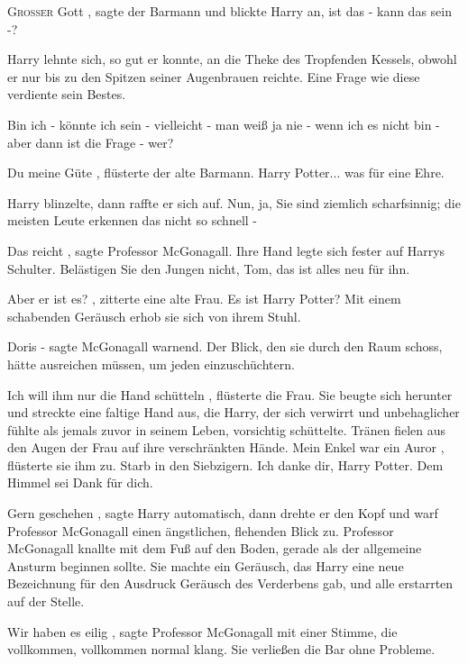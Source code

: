
\lettrine{\glqq G}{roßer} Gott\grqq{} , sagte der Barmann
und blickte Harry an, \glqq ist das - kann das sein -?\grqq{}

Harry lehnte sich, so gut er konnte, an die
Theke des Tropfenden Kessels, obwohl er nur bis zu den Spitzen seiner Augenbrauen reichte. Eine Frage wie diese
verdiente sein Bestes.

\glqq Bin ich - könnte ich sein - vielleicht - man weiß ja nie - wenn ich es nicht
bin - aber dann ist die Frage - wer?\grqq{}

\glqq Du meine Güte\grqq{} , flüsterte der alte Barmann.
\glqq Harry Potter... was für eine Ehre.\grqq{}

 Harry blinzelte, dann raffte er sich auf. \glqq Nun, ja, Sie
sind ziemlich scharfsinnig; die meisten Leute erkennen das nicht so schnell -\grqq{}

\glqq Das reicht\grqq{} ,
sagte Professor McGonagall. Ihre Hand legte sich fester auf Harrys Schulter. \glqq Belästigen Sie den Jungen nicht, Tom,
das ist alles neu für ihn.\grqq{}

\glqq Aber er ist es?\grqq{} , zitterte eine alte Frau. \glqq Es ist Harry
Potter?\grqq{} Mit einem schabenden Geräusch erhob sie sich von ihrem Stuhl.

\glqq Doris -\grqq{} sagte
McGonagall warnend. Der Blick, den sie durch den Raum schoss, hätte ausreichen müssen, um jeden einzuschüchtern.

\glqq Ich will ihm nur die Hand schütteln\grqq{} , flüsterte die Frau. Sie beugte sich herunter und streckte
eine faltige Hand aus, die Harry, der sich verwirrt und unbehaglicher fühlte als jemals zuvor in seinem Leben,
vorsichtig schüttelte. Tränen fielen aus den Augen der Frau auf ihre verschränkten Hände. \glqq Mein Enkel war ein
Auror\grqq{} , flüsterte sie ihm zu. \glqq Starb in den Siebzigern. Ich danke dir, Harry Potter. Dem Himmel sei Dank für
dich.\grqq{}

\glqq Gern geschehen\grqq{} , sagte Harry automatisch, dann drehte er den Kopf und warf Professor
McGonagall einen ängstlichen, flehenden Blick zu. Professor McGonagall knallte mit dem Fuß auf den Boden, gerade als der
allgemeine Ansturm beginnen sollte. Sie machte ein Geräusch, das Harry eine neue Bezeichnung für den Ausdruck
\glqq Geräusch des Verderbens\grqq{} gab, und alle erstarrten auf der Stelle.

\glqq Wir haben es eilig\grqq{} ,
sagte Professor McGonagall mit einer Stimme, die vollkommen, vollkommen normal klang. Sie verließen die Bar ohne
Probleme.

